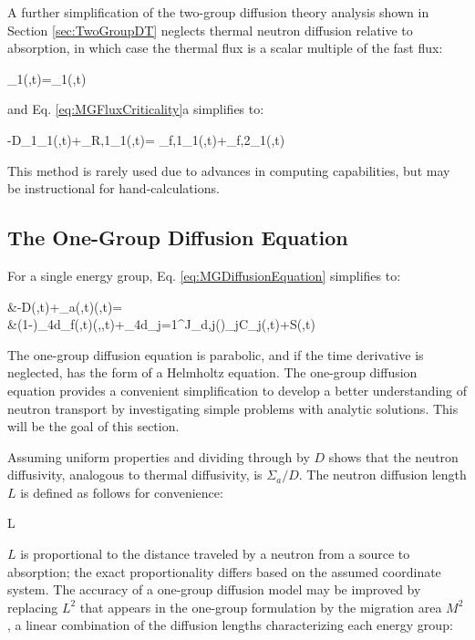 A further simplification of the two-group diffusion theory analysis shown in Section \ref{sec:TwoGroupDT} neglects thermal neutron diffusion relative to absorption, in which case the thermal flux is a scalar multiple of the fast flux:

\beq
\phi_1(,t)=\phi_1(,t)
\eeq

and Eq. \eqref{eq:MGFluxCriticality}a simplifies to:

\beq
-\nabla\cdot\left\lbrack D_1\nabla\phi_1(,t)\right\rbrack+\Sigma_{R,1}\phi_1(,t)=
\left\lbrack\nu\Sigma_{f,1}\phi_1(,t)+\nu\Sigma_{f,2}\phi_1(,t)\right\rbrack\\
\eeq

This method is rarely used due to advances in computing capabilities, but may be instructional for hand-calculations.

\subsection{The One-Group Diffusion Equation}
For a single energy group, Eq. \eqref{eq:MGDiffusionEquation} simplifies to:

\beqa
\label{eq:1GDiffusionEquation}
&-\nabla\cdot\left\lbrack D\nabla\phi(,t)\right\rbrack+\Sigma_a(,t)\phi(,t)=\\
&\hspace{1cm}(1-\beta)\int_{4\pi}d\hO\nu\Sigma_f(,t)\phi(,\hO,t)+\int_{4\pi}d\hO\sum_{j=1}^J\chi_{d,j}(\hO)\lambda_jC_j(,t)+S(,t)
\eeqa

The one-group diffusion equation is parabolic, and if the time derivative is neglected, has the form of a Helmholtz equation. The one-group diffusion equation provides a convenient simplification to develop a better understanding of neutron transport by investigating simple problems with analytic solutions. This will be the goal of this section. 

Assuming uniform properties and dividing through by \(D\) shows that the neutron diffusivity, analogous to thermal diffusivity, is \(\Sigma_a/D\). The neutron diffusion length \(L\) is defined as follows for convenience:

\beq
\label{eq:DiffusionLength}
L\equiv{}
\eeq

\(L\) is proportional to the distance traveled by a neutron from a source to absorption; the exact proportionality differs based on the assumed coordinate system. The accuracy of a one-group diffusion model may be improved by replacing \(L^2\) that appears in the one-group formulation by the migration area \(M^2\), a linear combination of the diffusion lengths characterizing each energy group:

